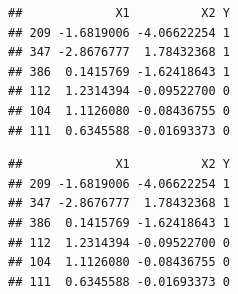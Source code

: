\begin{Shaded}
\begin{Highlighting}[]
\NormalTok{(}\NormalTok{)}

\OtherTok{\textless{}{-}}\NormalTok{ df[}\NormalTok{(}\NormalTok{(df)), ]  }
\end{Highlighting}
\end{Shaded}

\begin{verbatim}
##             X1          X2 Y
## 209 -1.6819006 -4.06622254 1
## 347 -2.8676777  1.78432368 1
## 386  0.1415769 -1.62418643 1
## 112  1.2314394 -0.09522700 0
## 104  1.1126080 -0.08436755 0
## 111  0.6345588 -0.01693373 0
\end{verbatim}

\begin{Shaded}
\begin{Highlighting}[]
\OtherTok{\textless{}{-}}  \SpecialCharTok{*} 

\OtherTok{\textless{}{-}}\NormalTok{ df[}\SpecialCharTok{:}\NormalTok{train\_test\_split,]  }
\end{Highlighting}
\end{Shaded}

\begin{verbatim}
##             X1          X2 Y
## 209 -1.6819006 -4.06622254 1
## 347 -2.8676777  1.78432368 1
## 386  0.1415769 -1.62418643 1
## 112  1.2314394 -0.09522700 0
## 104  1.1126080 -0.08436755 0
## 111  0.6345588 -0.01693373 0
\end{verbatim}

\begin{Shaded}
\begin{Highlighting}[]
\OtherTok{\textless{}{-}}\NormalTok{ df[(train\_test\_split}\SpecialCharTok{+}\NormalTok{)}\SpecialCharTok{:} \NormalTok{(df),] }
\end{Highlighting}
\end{Shaded}

